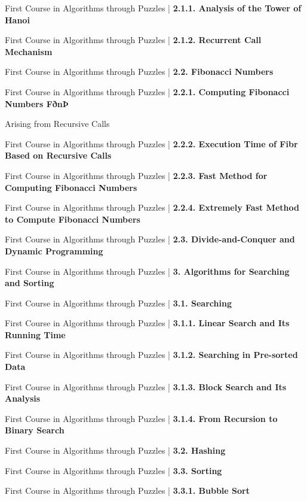 \documentclass[a4, landscape, 12pt]{article}
\newcommand{\checkbox}{$\square$}%
\begin{document}
\begin{itemize}
{{}
\item [\checkbox]  First Course in Algorithms through Puzzles | \textbf{ 2.1.1. Analysis of the Tower of Hanoi
}
\item [\checkbox]  First Course in Algorithms through Puzzles | \textbf{ 2.1.2. Recurrent Call Mechanism
}
\item [\checkbox]  First Course in Algorithms through Puzzles | \textbf{ 2.2. Fibonacci Numbers
}
\item [\checkbox]  First Course in Algorithms through Puzzles | \textbf{ 2.2.1. Computing Fibonacci Numbers FðnÞ 
}
\item [\checkbox]  Arising from Recursive Calls
}
\item [\checkbox]  First Course in Algorithms through Puzzles | \textbf{ 2.2.2. Execution Time of Fibr Based on Recursive Calls
}
\item [\checkbox]  First Course in Algorithms through Puzzles | \textbf{ 2.2.3. Fast Method for Computing Fibonacci Numbers
}
\item [\checkbox]  First Course in Algorithms through Puzzles | \textbf{ 2.2.4. Extremely Fast Method to Compute Fibonacci Numbers
}
\item [\checkbox]  First Course in Algorithms through Puzzles | \textbf{ 2.3. Divide-and-Conquer and Dynamic Programming
}
\item [\checkbox]  First Course in Algorithms through Puzzles | \textbf{ 3. Algorithms for Searching and Sorting
}
\item [\checkbox]  First Course in Algorithms through Puzzles | \textbf{ 3.1. Searching
}
\item [\checkbox]  First Course in Algorithms through Puzzles | \textbf{ 3.1.1. Linear Search and Its Running Time
}
\item [\checkbox]  First Course in Algorithms through Puzzles | \textbf{ 3.1.2. Searching in Pre-sorted Data
}
\item [\checkbox]  First Course in Algorithms through Puzzles | \textbf{ 3.1.3. Block Search and Its Analysis
}
\item [\checkbox]  First Course in Algorithms through Puzzles | \textbf{ 3.1.4. From Recursion to Binary Search
}
\item [\checkbox]  First Course in Algorithms through Puzzles | \textbf{ 3.2. Hashing
}
\item [\checkbox]  First Course in Algorithms through Puzzles | \textbf{ 3.3. Sorting
}
\item [\checkbox]  First Course in Algorithms through Puzzles | \textbf{ 3.3.1. Bubble Sort
}
\end{itemize}
\end{document}
